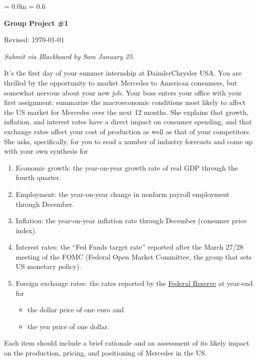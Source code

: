 \documentclass[letterpaper,12pt]{article}
\def\HeadName{Group Project \#1}
\begin{document}
\parindent = 0.0in
\parskip = 0.6\bigskipamount
\thispagestyle{empty}%
\Head

\centerline{\large \bf \HeadName}%
\centerline{Revised:  \today}

\medskip 
{\it Submit via Blackboard by 9am January 25.}
\medskip

It's the first day of your summer internship at DaimlerChrysler USA.
You are thrilled by the opportunity to market Mercedes to American consumers, 
but somewhat nervous about your new job.  
Your boss enters your office with your first assignment:  
summarize the macroeconomic conditions most likely to affect 
the US market for Mercedes over the next 12 months.  
She explains that growth, inflation, and interest rates 
have a direct impact on consumer spending, 
and that exchange rates affect your cost of production 
as well as that of your competitors.  
She asks, specifically, for you to read a number of 
industry forecasts and come up with your own synthesis for 
%
\begin{enumerate}
\bigskipamount
{}\bigskipamount

\item Economic growth:  
the year-on-year growth rate of real GDP through the fourth quarter.  

\item Employment:  the year-on-year 
change in nonfarm payroll employment 
through December.  

\item Inflation:  
the year-on-year inflation rate through December 
(consumer price index).  

\item Interest rates:  the ``Fed Funds target rate'' reported 
after the March 27/28 meeting of the FOMC
(Federal Open Market Committee, 
the group that sets US monetary policy).  

\item Foreign exchange rates:  
the rates reported by the 
\href{http://www.federalreserve.gov/releases/h10/update/}
{Federal Reserve} at year-end for 
\begin{itemize}
\item the dollar price of one euro and 
\item the yen price of one dollar.  
\end{itemize}

\end{enumerate}
Each item should include a brief rationale 
and an assessment of its likely impact on the production, pricing, and positioning of Mercedes in the US.  
\end{document}
